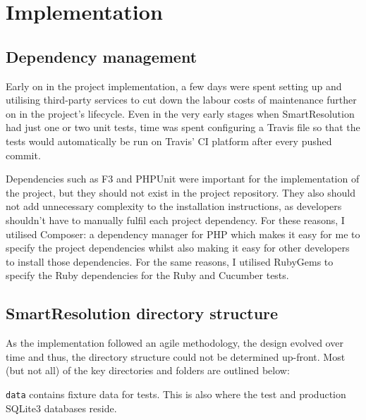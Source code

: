 \chapter{Implementation}

\section{Dependency management}

Early on in the project implementation, a few days were spent setting up and utilising third-party services to cut down the labour costs of maintenance further on in the project's lifecycle. Even in the very early stages when SmartResolution had just one or two unit tests, time was spent configuring a Travis file so that the tests would automatically be run on Travis' CI platform after every pushed commit.

Dependencies such as F3 and PHPUnit were important for the implementation of the project, but they should not exist in the project repository. They also should not add unnecessary complexity to the installation instructions, as developers shouldn't have to manually fulfil each project dependency. For these reasons, I utilised Composer: a dependency manager for PHP which makes it easy for me to specify the project dependencies whilst also making it easy for other developers to install those dependencies. For the same reasons, I utilised RubyGems to specify the Ruby dependencies for the Ruby and Cucumber tests.

\section{SmartResolution directory structure}

As the implementation followed an agile methodology, the design evolved over time and thus, the directory structure could not be determined up-front. Most (but not all) of the key directories and folders are outlined below:

\begin{minipage}{\textwidth}
\end{minipage}

\lstinline{data} contains fixture data for tests. This is also where the test and production SQLite3 databases reside.

